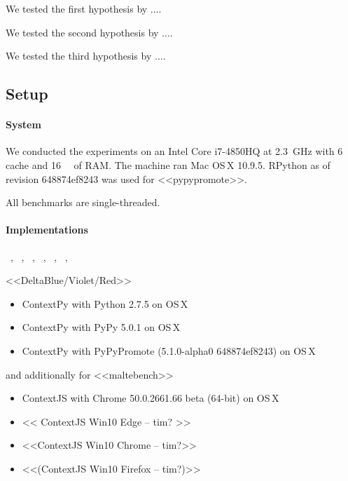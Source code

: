 \documentclass[preprint,english,10pt,nonatbib]{sigplanconf}
\begin{document}
We tested the first hypothesis by ....

We tested the second hypothesis by ....

We tested the third hypothesis by ....


\subsection{Setup}
\label{sec:setup}


\paragraph{System} We conducted the experiments on %
an Intel Core i7-4850HQ at \SI{2.3}{\GHz} with \SI{6}{\mega\byte} cache and
\SI{16}{\giga\byte} of RAM. The machine ran Mac OS\,X 10.9.5.
%
RPython as of revision
648874ef8243
 was used for <<pypypromote>>.

All benchmarks are single-threaded.


\paragraph{Implementations} %
~, %
~, %
~, %
~, %
~, %
~, %

<<DeltaBlue/Violet/Red>>
\begin{itemize}
\item ContextPy with Python 2.7.5 on OS\,X
\item ContextPy with PyPy 5.0.1 on OS\,X
\item ContextPy with PyPyPromote (5.1.0-alpha0 648874ef8243) on OS\,X
\end{itemize}

and additionally for <<maltebench>>
\begin{itemize}
\item ContextJS with Chrome 50.0.2661.66 beta (64-bit) on OS\,X
\item << ContextJS Win10 Edge -- tim? >>
\item <<ContextJS Win10 Chrome -- tim?>>
\item <<(ContextJS Win10 Firefox -- tim?)>>
\end{itemize}
\end{document}
